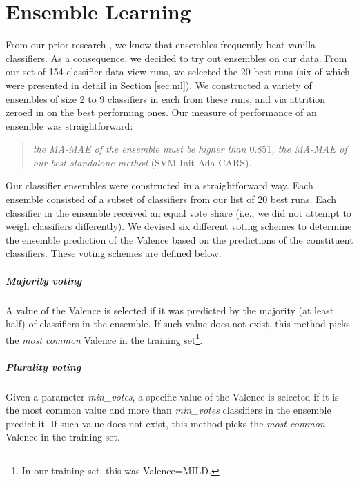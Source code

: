 \chapter{Ensemble Learning}\label{sec:ensembles}
From our prior research \cite{kang2016ensemble,an2016map}, we know that ensembles frequently beat vanilla classifiers.
As a consequence, we decided to try out ensembles on our data.
From our set of 154 classifier data view runs, we  selected the 20 best runs (six of which
were presented in detail in Section \ref{sec:ml}). We constructed
a variety of ensembles of size 2 to 9 classifiers in each 
from these runs, and via attrition zeroed in on
the best performing ones. Our measure of performance of an ensemble
was straightforward:

\begin{quote}
\textit{the \textsf{MA-MAE} of the ensemble must
be higher than $0.851$, the \textsf{MA-MAE} of our best standalone method}
(\textsf{SVM-Init-Ada-CARS}).
\end{quote} 


Our classifier ensembles were constructed in a straightforward way. Each ensemble
consisted of a subset of classifiers from our list of 20
best runs. Each classifier in the ensemble
received an equal vote share (i.e., we did not attempt to weigh
classifiers differently). We devised six different voting schemes to determine
the ensemble prediction of the \textsf{Valence} based on the predictions
of the constituent classifiers.  These voting schemes are defined below.

\paragraph{Majority voting} A value of the \textsf{Valence} is selected
if it was predicted by the majority (at least half) of classifiers in the
ensemble. If such value does not exist, this method picks the \textit{most common} \textsf{Valence} in the training set\footnote{In our training set,
this was \textsf{Valence=MILD}.}.

\paragraph{Plurality voting} Given a parameter \textit{min\_votes}, a
specific value of the \textsf{Valence} is selected if it is the most
common value and more than \textit{min\_votes} classifiers in the
ensemble predict it. If such value does not exist, 
this method picks the \textit{most common} \textsf{Valence} in the training set.

